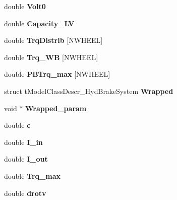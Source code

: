 \begin{DoxyCompactItemize}
\mbox{\label{structt_my_model_a25ec663343ab55ad5df2764ca7b722fa}} 
double {\bfseries Volt0}
\item 
\mbox{\label{structt_my_model_aad2beb7411fd902376ecf92364af259c}} 
double {\bfseries Capacity\+\_\+\+LV}
\item 
\mbox{\label{structt_my_model_a8872c20bb459ea9a82a87a92d1ea9355}} 
double {\bfseries Trq\+Distrib} \mbox{[}N\+W\+H\+E\+EL\mbox{]}
\item 
\mbox{\label{structt_my_model_ac6cce98fdb476050f8938dd1d550e4fc}} 
double {\bfseries Trq\+\_\+\+WB} \mbox{[}N\+W\+H\+E\+EL\mbox{]}
\item 
\mbox{\label{structt_my_model_a67737f1cf313c752a75894eb4f561c78}} 
double {\bfseries P\+B\+Trq\+\_\+max} \mbox{[}N\+W\+H\+E\+EL\mbox{]}
\item 
\mbox{\label{structt_my_model_a4598a31c155019375d8bcb6ccb5cf0cb}} 
struct t\+Model\+Class\+Descr\+\_\+\+Hyd\+Brake\+System {\bfseries Wrapped}
\item 
\mbox{\label{structt_my_model_a6881c3605863616a145b457a9f9af8f9}} 
void $\ast$ {\bfseries Wrapped\+\_\+param}
\item 
\mbox{\label{structt_my_model_a7824d20056158bb4027d24102289bc66}} 
double {\bfseries c}
\item 
\mbox{\label{structt_my_model_af83b4483f3daac9bf089ea1912108f17}} 
double {\bfseries I\+\_\+in}
\item 
\mbox{\label{structt_my_model_a8aadac721bea8d19fe914c956b939836}} 
double {\bfseries I\+\_\+out}
\item 
\mbox{\label{structt_my_model_ac8b5747146b1af5052cf4f2aea143604}} 
double {\bfseries Trq\+\_\+max}
\item 
\mbox{\label{structt_my_model_a89e5ebf4846819a0000223d0bee82ecb}} 
double {\bfseries drotv}

\end{DoxyCompactItemize}
